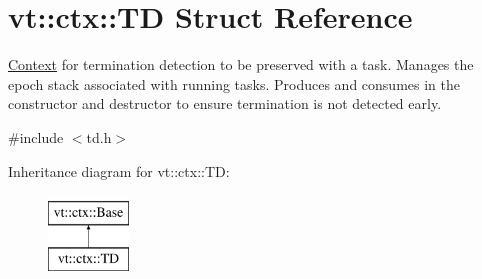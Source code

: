 \hypertarget{structvt_1_1ctx_1_1_t_d}{}\section{vt\+:\+:ctx\+:\+:TD Struct Reference}
\label{structvt_1_1ctx_1_1_t_d}


\hyperlink{structvt_1_1ctx_1_1_context}{Context} for termination detection to be preserved with a task. Manages the epoch stack associated with running tasks. Produces and consumes in the constructor and destructor to ensure termination is not detected early.  




{\ttfamily \#include $<$td.\+h$>$}

Inheritance diagram for vt\+:\+:ctx\+:\+:TD\+:\begin{figure}[H]
\begin{center}
\leavevmode
\includegraphics[height=2.000000cm]{structvt_1_1ctx_1_1_t_d}
\end{center}
\end{figure}

